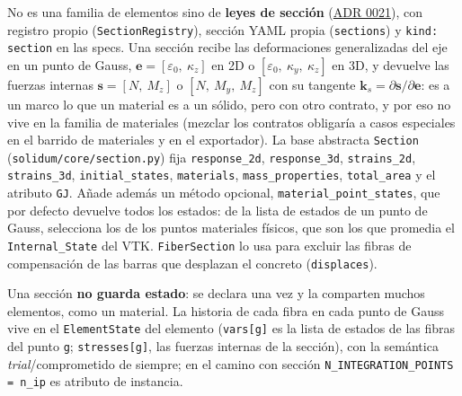 \documentclass[11pt,oneside]{report}
\begin{document}
No es una familia de elementos sino de \textbf{leyes de sección} (\hyperref[adr:0021]{ADR 0021}), con registro propio (\texttt{SectionRegistry}), sección YAML propia (\texttt{sections}) y \texttt{kind: section} en las specs. Una sección recibe las deformaciones generalizadas del eje en un punto de Gauss, $\mathbf e = [\varepsilon_0,\ \kappa_z]$ en 2D o $[\varepsilon_0,\ \kappa_y,\ \kappa_z]$ en 3D, y devuelve las fuerzas internas $\mathbf s = [N,\ M_z]$ o $[N,\ M_y,\ M_z]$ con su tangente $\mathbf k_s = \partial\mathbf s/\partial\mathbf e$: es a un marco lo que un material es a un sólido, pero con otro contrato, y por eso no vive en la familia de materiales (mezclar los contratos obligaría a casos especiales en el barrido de materiales y en el exportador). La base abstracta \texttt{Section} (\texttt{solidum/\allowbreak{}core/\allowbreak{}section.\allowbreak{}py}) fija \texttt{response\_2d}, \texttt{response\_3d}, \texttt{strains\_2d}, \texttt{strains\_3d}, \texttt{initial\_states}, \texttt{materials}, \texttt{mass\_properties}, \texttt{total\_area} y el atributo \texttt{GJ}. Añade además un método opcional, \texttt{material\_\allowbreak{}point\_\allowbreak{}states}, que por defecto devuelve todos los estados: de la lista de estados de un punto de Gauss, selecciona los de los puntos materiales físicos, que son los que promedia el \texttt{Internal\_State} del VTK. \texttt{FiberSection} lo usa para excluir las fibras de compensación de las barras que desplazan el concreto (\texttt{displaces}).

Una sección \textbf{no guarda estado}: se declara una vez y la comparten muchos elementos, como un material. La historia de cada fibra en cada punto de Gauss vive en el \texttt{ElementState} del elemento (\texttt{vars[g]} es la lista de estados de las fibras del punto \texttt{g}; \texttt{stresses[g]}, las fuerzas internas de la sección), con la semántica \textit{trial}/comprometido de siempre; en el camino con sección \texttt{N\_\allowbreak{}INTEGRATION\_\allowbreak{}POINTS = n\_\allowbreak{}ip} es atributo de instancia.
\end{document}
